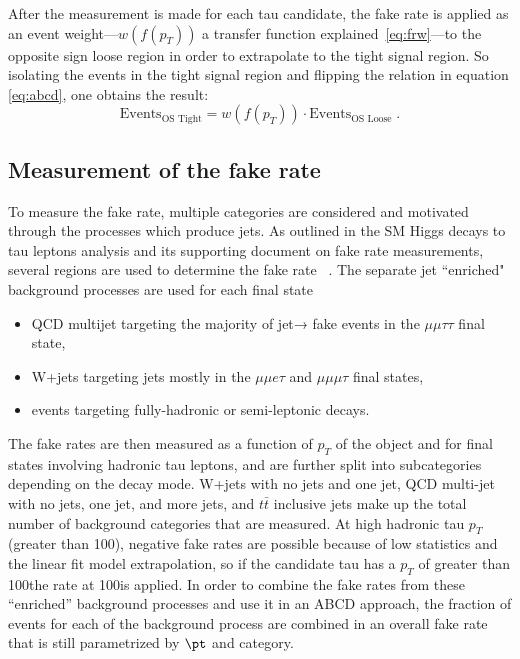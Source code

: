 After the measurement is made for each tau candidate, the fake rate is applied as an event weight---$w(f(p_T))$ a transfer function explained~\ref{eq:frw}---to the opposite sign loose region in order to extrapolate to the tight signal region. So isolating the events in the tight signal region and flipping the relation in equation \ref{eq:abcd}, one obtains the result: 
\begin{equation}
\text{Events}_\text{OS Tight} = w(f(p_T))\cdot \text{Events}_\text{OS Loose} \;\text{.}
\end{equation}

\subsection{Measurement of the fake rate}
To measure the fake rate, multiple categories are considered and motivated through the processes which produce jets. As outlined in the SM Higgs decays to tau leptons analysis and its supporting document on fake rate measurements, several regions are used to determine the fake rate ~\cite{SMHTTarXiv}. The separate jet ``enriched" background processes are used for each final state
\begin{itemize}
	\item QCD multijet targeting the majority of jet→ \tauh fake events in the $\mu\mu\tau\tau$ final state,
	\item W+jets targeting jets mostly in the $\mu\mu e\tau$ and $\mu\mu\mu\tau$ final states,
	\item \ttbar events targeting fully-hadronic or semi-leptonic decays.
\end{itemize} 



The fake rates are then measured as a function of $p_T$ of the object and for final states involving hadronic tau leptons, and are further split into subcategories depending on the decay mode.  
W+jets with no jets and one jet, QCD multi-jet with no jets, one jet, and more jets, and $t\bar{t}$ inclusive jets make up the total number of background categories that are measured. 
At high hadronic tau $p_T$ (greater than 100\GeV), negative fake rates are possible because of low statistics and the linear fit model extrapolation, so if the candidate tau has a $p_T$ of greater than 100\GeV the rate at 100\GeV is applied. 
In order to combine the fake rates from these ``enriched'' background processes and use it in an ABCD approach, the fraction of events for each of the background process are combined in an overall fake rate that is still parametrized by $\pt$ and category.  

